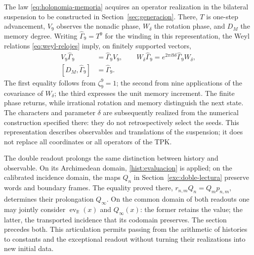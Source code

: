 The law \eqref{eq:holonomia-memoria} acquires an operator realization
in the bilateral suspension to be constructed in
Section~\ref{sec:generacion}. There, \(T\) is one-step advancement,
\(V_9\) observes the nonadic phase, \(W_\delta\) the rotation phase, and
\(D_M\) the memory degree. Writing
\(\widehat\Gamma_9=T^9\) for the winding in this representation,
the Weyl relations \eqref{eq:weyl-relojes} imply, on finitely
supported vectors,
\begin{equation}
 \begin{aligned}
 V_9\widehat\Gamma_9&=\widehat\Gamma_9V_9,\qquad
 W_\delta\widehat\Gamma_9=e^{2\pi i9\delta}
     \widehat\Gamma_9W_\delta,\\
 [D_M,\widehat\Gamma_9]&=\widehat\Gamma_9.
 \end{aligned}
 \label{hist:tres-retornos}
\end{equation}
The first equality follows from \(\zeta_9^9=1\); the second from nine
applications of the covariance of \(W_\delta\); the third expresses
the unit memory increment. The finite phase returns, while irrational
rotation and memory distinguish the next state. The
characters and parameter \(\delta\) are subsequently realized from the
numerical construction specified there: they do not retrospectively select
the seeds. This representation describes observables and translations of
the suspension; it does not replace all coordinates or all operators
of the TPK.

The double readout prolongs the same distinction between history and observable.
On its Archimedean domain, \eqref{hist:evaluacion} is applied; on the
calibrated incidence domain, the maps \(Q_n\) in
Section~\ref{exc:doble-lectura} preserve words and boundary
frames. The equality proved there,
\(r_{n,m}Q_n=Q_mp_{n,m}\), determines their prolongation \(Q_\infty\).
On the common domain of both readouts one may jointly consider
\(\operatorname{ev}_{\mathbb R}(x)\) and \(Q_\infty(x)\): the
former retains the value; the latter, the transported incidence that its
codomain preserves. The section precedes both. This articulation permits
passing from the arithmetic of histories to constants and the exceptional
readout without turning their realizations into new initial data.
